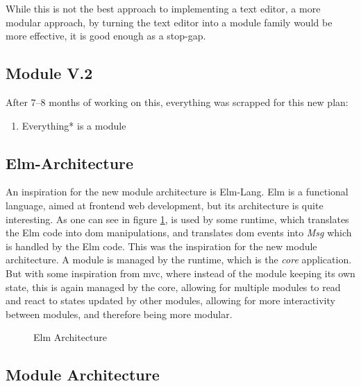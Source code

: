 While this is not the best approach to implementing a text editor, a more
modular approach, by turning the text editor into a module family would be more
effective, it is good enough as a stop-gap.

\subsection{Module V.2}


After 7–8 months of working on this, everything was scrapped for this new plan:

\begin{enumerate}
  \item Everything* is a module
\end{enumerate}

\subsection{Elm-Architecture}

An inspiration for the new module architecture is Elm-Lang. Elm is a functional
language, aimed at frontend web development, but its architecture is quite
interesting. As one can see in figure \ref{fig:elmArchitecture}, is used by some
runtime, which translates the Elm code into \gls{dom} manipulations, and translates
\gls{dom} events into \textit{Msg} which is handled by the Elm code. This was the
inspiration for the new module architecture. A module is managed by the runtime,
which is the \textit{core} application. But with some inspiration from
\gls{mvc}, where instead of the module keeping its own state, this is again
managed by the core, allowing for multiple modules to read and react to states
updated by other modules, allowing for more interactivity between modules, and
therefore being more modular.

\begin{figure}
  \centering
  
  \caption{Elm Architecture}
  \label{fig:elmArchitecture}
\end{figure}

\subsection{Module Architecture}

